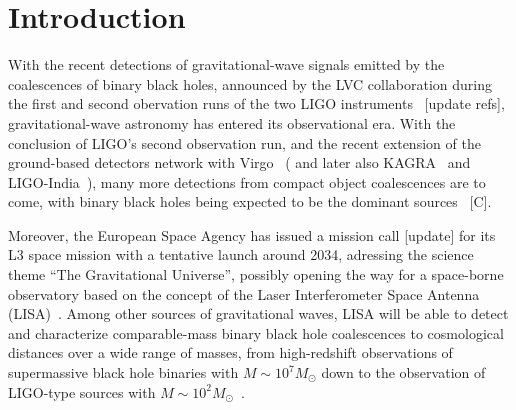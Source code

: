 \documentclass[aps,showpacs,twocolumn,
prd,superscriptaddress,nofootinbib]{revtex4-1}
\newcommand{\Msol}{M_{\odot}}
\newcommand{\SM}[1]{{\color{Red} #1}}
\newcommand{\jgb}[1]{{\color{DarkGreen} #1}}
\begin{document}
\maketitle


\section{Introduction}
\label{sec:intro}

With the recent detections of gravitational-wave signals emitted by the coalescences of binary black holes, announced by the LVC collaboration during the first and second obervation runs of the two LIGO instruments~\cite{LIGO-theevent-2016,LIGO-christmasevent-2016,LIGO-O1BBH-2016}\jgb{[update refs]}, gravitational-wave astronomy has entered its observational era. With the conclusion of LIGO's second observation run, and the recent extension of the ground-based detectors network with Virgo~\cite{Virgo} ( and later also KAGRA~\cite{KAGRA} and LIGO-India~\cite{INDIGO}), many more detections from compact object coalescences are to come, with binary black holes being expected to be the dominant sources~\cite{} \SM{[C]}.

Moreover, the European Space Agency has issued a mission call \SM{[update]} for its L3 space mission with a tentative launch around 2034, adressing the science theme ``The Gravitational Universe'', possibly opening the way for a space-borne observatory based on the concept of the Laser Interferometer Space Antenna (LISA)~\cite{LISA09,LISA17}. Among other sources of gravitational waves, LISA will be able to detect and characterize comparable-mass binary black hole coalescences to cosmological distances over a wide range of masses, from high-redshift observations of supermassive black hole binaries with $M\sim 10^{7} \Msol$ down to the observation of LIGO-type sources with $M\sim 10^{2} \Msol$~\cite{Sesana16}.
\end{document}
